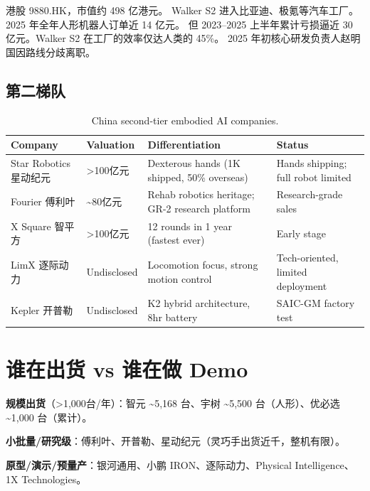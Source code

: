港股 9880.HK，市值约 498 亿港元\cite{ubtech2025hk}。
Walker S2 进入比亚迪、极氪等汽车工厂。2025 年全年人形机器人订单近 14 亿元。
但 2023--2025 上半年累计亏损逼近 30 亿元。Walker S2 在工厂的效率仅达人类的 45\%\cite{ubtech2025efficiency}。
2025 年初核心研发负责人赵明国因路线分歧离职。

\subsection{第二梯队}

\begin{table}[htbp]
\centering
\caption{China second-tier embodied AI companies.}
\label{tab:cn-tier2}
\begin{tabularx}{\textwidth}{llXl}
\toprule
\rowcolor{figLightGray}
\textbf{Company} & \textbf{Valuation} & \textbf{Differentiation} & \textbf{Status} \\
\midrule
Star Robotics 星动纪元 & >100亿元 & Dexterous hands (1K shipped, 50\% overseas) & Hands shipping; full robot limited \\
Fourier 傅利叶 & \textasciitilde80亿元 & Rehab robotics heritage; GR-2 research platform & Research-grade sales \\
X Square 智平方 & >100亿元 & 12 rounds in 1 year (fastest ever) & Early stage \\
LimX 逐际动力 & Undisclosed & Locomotion focus, strong motion control & Tech-oriented, limited deployment \\
Kepler 开普勒 & Undisclosed & K2 hybrid architecture, 8hr battery & SAIC-GM factory test \\
\bottomrule
\end{tabularx}
\end{table}

\section{谁在出货 vs 谁在做 Demo}

\begin{keybox}[出货量排名 2025]
\textbf{规模出货}（>1,000台/年）：智元 \textasciitilde5,168 台、宇树 \textasciitilde5,500 台（人形）、优必选 \textasciitilde1,000 台（累计）。

\textbf{小批量/研究级}：傅利叶、开普勒、星动纪元（灵巧手出货近千，整机有限）。

\textbf{原型/演示/预量产}：银河通用、小鹏 IRON、逐际动力、Physical Intelligence、1X Technologies。
\end{keybox}

